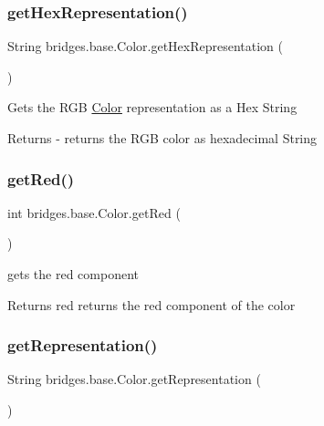 \subsubsection{\texorpdfstring{get\+Hex\+Representation()}{getHexRepresentation()}}
{\footnotesize\ttfamily String bridges.\+base.\+Color.\+get\+Hex\+Representation (\begin{DoxyParamCaption}{ }\end{DoxyParamCaption})}

Gets the R\+GB \mbox{\hyperlink{classbridges_1_1base_1_1_color}{Color}} representation as a Hex String

\begin{DoxyReturn}{Returns}
-\/ returns the R\+GB color as hexadecimal String 
\end{DoxyReturn}
\mbox{\label{classbridges_1_1base_1_1_color_af1a30dc925b35d6bfe609f8838651025}} 
\subsubsection{\texorpdfstring{get\+Red()}{getRed()}}
{\footnotesize\ttfamily int bridges.\+base.\+Color.\+get\+Red (\begin{DoxyParamCaption}{ }\end{DoxyParamCaption})}

gets the red component

\begin{DoxyReturn}{Returns}
red returns the red component of the color 
\end{DoxyReturn}
\mbox{\label{classbridges_1_1base_1_1_color_a2f9b0cb588e49b2ebf2f015d4d7507d0}} 
\subsubsection{\texorpdfstring{get\+Representation()}{getRepresentation()}}
{\footnotesize\ttfamily String bridges.\+base.\+Color.\+get\+Representation (\begin{DoxyParamCaption}{ }\end{DoxyParamCaption})}


